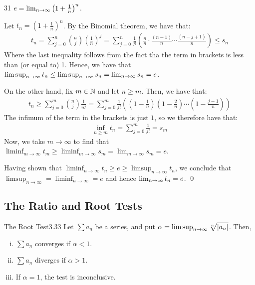 \setcounter{rudin}{30}
\begin{theorem}{}{31}
    $e = \lim_{n \rightarrow \infty} \left(1 + \frac{1}{n}\right)^n$.
\end{theorem}
\begin{nproof}
    Let $t_n = \left(1 + \frac{1}{n}\right)^n$. By the Binomial theorem, we have that:
    \begin{align*}
        t_n = \sum_{j=0}^n \binom{n}{j}\left(\frac{1}{n}\right)^j = \sum_{j=0}^n \frac{1}{j!}\left(\frac{n}{n}\cdot\frac{(n-1)}{n}\cdots \frac{(n-j+1)}{n}\right) \leq s_n
    \end{align*}
    Where the last inequality follows from the fact tha the term in brackets is less than (or equal to) 1. Hence, we have that $\limsup_{n \rightarrow \infty} t_n \leq \limsup_{n\rightarrow \infty} s_n = \lim_{n \rightarrow \infty} s_n = e$. 

    On the other hand, fix $m \in \mathbb{N}$ and let $n \geq m$. Then, we have that:
    \begin{align*}
        t_n \geq \sum_{j=0}^m \binom{n}{j}\frac{1}{n^j} = \sum_{j=0}^m \frac{1}{j!}\left(\left(1 - \frac{1}{n}\right)\left(1 - \frac{2}{n}\right) \cdots \left(1 - \frac{j-1}{n}\right)\right)
    \end{align*}
    The infimum of the term in the brackets is just $1$, so we therefore have that:
    \begin{align*}
        \inf_{n \geq m} t_n = \sum_{j=0}^m \frac{1}{j!} = s_m
    \end{align*}
    Now, we take $m \rightarrow \infty$ to find that $\liminf_{m \rightarrow \infty} t_m \geq \liminf_{m \rightarrow \infty} s_m = \lim_{m \rightarrow \infty} s_m = e$. 

    Having shown that $\liminf_{n \rightarrow \infty} t_n \geq e \geq \limsup_{n \rightarrow \infty} t_n$, we conclude that $\limsup_{n \rightarrow \infty} = \liminf_{n \rightarrow \infty} = e$ and hence $\lim_{n \rightarrow \infty} t_n = e$. \qed
\end{nproof}

\subsection{The Ratio and Root Tests}
\setcounter{rudin}{32}
\begin{theorem}{The Root Test}{3.33}
    Let $\sum a_n$ be a series, and put $\alpha = \limsup_{n \rightarrow \infty} \sqrt[n]{\abs{a_n}}$. Then,
    \begin{enumerate}[(i)]
        \item $\sum a_n$ converges if $\alpha < 1$.
        \item $\sum a_n$ diverges if $\alpha > 1$. 
        \item If $\alpha = 1$, the test is inconclusive.
    \end{enumerate}
\end{theorem}

